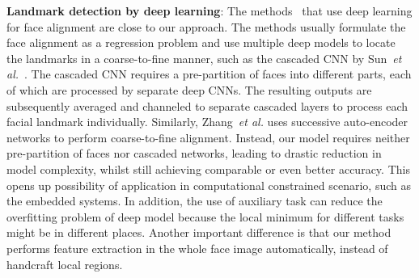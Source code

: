 \documentclass[10pt,journal,compsoc]{IEEEtran}
\newcommand{\etal}{\emph{et al.}}
\begin{document}
\vspace{0.1cm}
\noindent \textbf{Landmark detection by deep learning}:
The methods~\cite{DeepRegression,zhang2014coarse,Sun2013} that use deep learning for face alignment are close to our approach. The methods usually formulate the face alignment as a regression problem and use multiple deep models to locate the landmarks in a coarse-to-fine manner, such as the cascaded CNN by Sun~\etal~\cite{Sun2013}. The cascaded CNN requires a pre-partition of faces into different parts, each of which are processed by separate deep CNNs. The resulting outputs are subsequently averaged and channeled to separate cascaded layers to process each facial landmark individually. Similarly, Zhang~\etal\cite{zhang2014coarse} uses successive auto-encoder networks to perform coarse-to-fine alignment. Instead, our model requires neither pre-partition of faces nor cascaded networks, leading to drastic reduction in model complexity, whilst still achieving comparable or even better accuracy. This opens up possibility of application in computational constrained scenario, such as the embedded systems. In addition, the use of auxiliary task can reduce the overfitting problem of deep model because the local minimum for different tasks might be in different places. Another important difference is that our method performs feature extraction in the whole face image automatically, instead of handcraft local regions.


\vspace{0.1cm}
\end{document}
